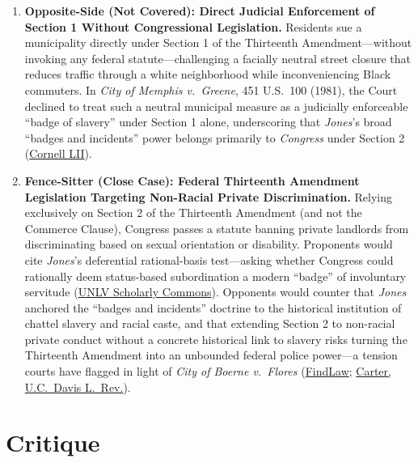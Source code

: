 \documentclass[12pt]{article}
\begin{document}
\begin{enumerate}
\item \textbf{Opposite-Side (Not Covered): Direct Judicial Enforcement of Section 1 Without Congressional Legislation.} Residents sue a municipality directly under Section 1 of the Thirteenth Amendment---without invoking any federal statute---challenging a facially neutral street closure that reduces traffic through a white neighborhood while inconveniencing Black commuters. In \textit{City of Memphis v.\ Greene}, 451 U.S.\ 100 (1981), the Court declined to treat such a neutral municipal measure as a judicially enforceable ``badge of slavery'' under Section 1 alone, underscoring that \textit{Jones}'s broad ``badges and incidents'' power belongs primarily to \emph{Congress} under Section 2 (\href{https://www.law.cornell.edu/constitution-conan/amendment-13/scope-of-enforcement-clause-of-thirteenth-amendment}{Cornell LII}).

\item \textbf{Fence-Sitter (Close Case): Federal Thirteenth Amendment Legislation Targeting Non-Racial Private Discrimination.} Relying exclusively on Section 2 of the Thirteenth Amendment (and not the Commerce Clause), Congress passes a statute banning private landlords from discriminating based on sexual orientation or disability. Proponents would cite \textit{Jones}'s deferential rational-basis test---asking whether Congress could rationally deem status-based subordination a modern ``badge'' of involuntary servitude (\href{https://scholars.law.unlv.edu/cgi/viewcontent.cgi?article=1013&context=amend13_bi}{UNLV Scholarly Commons}). Opponents would counter that \textit{Jones} anchored the ``badges and incidents'' doctrine to the historical institution of chattel slavery and racial caste, and that extending Section 2 to non-racial private conduct without a concrete historical link to slavery risks turning the Thirteenth Amendment into an unbounded federal police power---a tension courts have flagged in light of \textit{City of Boerne v.\ Flores} (\href{https://caselaw.findlaw.com/court/us-10th-circuit/1637502.html}{FindLaw}; \href{https://lawreview.law.ucdavis.edu/sites/g/files/dgvnsk15026/files/media/documents/DavisVol40No4_Carter.pdf}{Carter, U.C.\ Davis L.\ Rev.}).
\end{enumerate}

\section{Critique}
\end{document}

